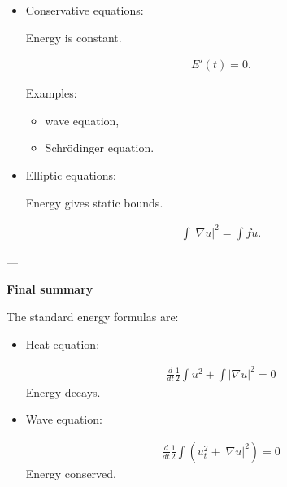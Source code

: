 \documentclass[12pt,a4paper]{report}
\begin{document}
\begin{description}
\begin{description}
\begin{itemize}
Energy decreases.

\begin{align*}
E'(t)\le 0.
\end{align*}

Examples:

	\begin{itemize}
    \item heat equation,
    \item reaction-diffusion,
    \item damped wave.
	\end{itemize}

    \item Conservative equations:

Energy is constant.

\begin{align*}
E'(t)=0.
\end{align*}

Examples:

	\begin{itemize}
    \item wave equation,
    \item Schrödinger equation.
	\end{itemize}

    \item Elliptic equations:

Energy gives static bounds.

\begin{align*}
\int |\nabla u|^2 = \int fu.
\end{align*}
	\end{itemize}

---

\item \textbf{Final summary}

The standard energy formulas are:

	\begin{itemize}
    \item Heat equation:

\begin{align*}
\boxed{
\frac{d}{dt}\frac12\int u^2 + \int |\nabla u|^2 = 0
}
\end{align*}
Energy decays.

    \item Wave equation:

\begin{align*}
\boxed{
\frac{d}{dt}\frac12\int (u_t^2+|\nabla u|^2)=0
}
\end{align*}
Energy conserved.


\end{itemize}
\end{description}
\end{description}
\end{document}

